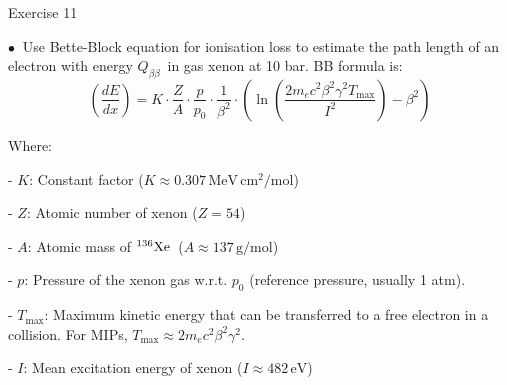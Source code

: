 \documentclass [aspectratio=169]{beamer}
\newcommand{\qbb}{\ensuremath{Q_{\beta\beta}}}
\newcommand{\XE}{\ensuremath{{}^{136}{\rm Xe}}}
\begin{document}
 \begin{frame}{Exercise 11}
 
 $\bullet~$ Use Bette-Block equation for ionisation loss to estimate the path length of an electron with energy \qbb\ in gas xenon at 10 bar. BB formula is:
 \[
\left( \frac{dE}{dx} \right) = K \cdot \frac{Z}{A} \cdot \frac{p}{p_0} \cdot \frac{1}{\beta^2} \cdot \left( \ln \left( \frac{2 m_e c^2 \beta^2 \gamma^2 T_{\text{max}}}{I^2} \right) - \beta^2 \right)
\]

Where:

- \( K \): Constant factor (\(K \approx 0.307 \, \mathrm{MeV \, cm^2 / mol}\))

- \( Z \): Atomic number of xenon (\(Z = 54\))

- \( A \): Atomic mass of \XE\ (\(A \approx 137 \, \mathrm{g/mol}\))

- \( p \): Pressure of the xenon gas w.r.t.  \( p_0 \) (reference pressure, usually 1 atm). 

- \( T_{\text{max}} \): Maximum kinetic energy that can be transferred to a free electron in a collision. 
%
  For MIPs,  \(T_{\text{max}} \approx 2 m_e c^2 \beta^2 \gamma^2\).

- \( I \): Mean excitation energy of xenon (\(I \approx 482 \, \mathrm{eV}\))

\end{frame}
\end{document}
